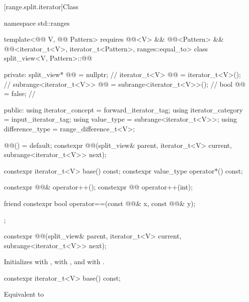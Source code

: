 [range.split.iterator]{Class }

\begin{codeblock}
namespace std::ranges {
  template<@@ V, @@ Pattern>
    requires @@<V> && @@<Pattern> &&
             @@<iterator_t<V>, iterator_t<Pattern>, ranges::equal_to>
  class split_view<V, Pattern>::@@ {
  private:
    split_view* @@ = nullptr;                              // \expos
    iterator_t<V> @@ = iterator_t<V>();                       // \expos
    subrange<iterator_t<V>> @@ = subrange<iterator_t<V>>();  // \expos
    bool @@ = false;                               // \expos

  public:
    using iterator_concept = forward_iterator_tag;
    using iterator_category = input_iterator_tag;
    using value_type = subrange<iterator_t<V>>;
    using difference_type = range_difference_t<V>;

    @@() = default;
    constexpr @@(split_view& parent, iterator_t<V> current, subrange<iterator_t<V>> next);

    constexpr iterator_t<V> base() const;
    constexpr value_type operator*() const;

    constexpr @@& operator++();
    constexpr @@ operator++(int);

    friend constexpr bool operator==(const @@& x, const @@& y);
  };
}
\end{codeblock}

\begin{itemdecl}
constexpr @@(split_view& parent, iterator_t<V> current, subrange<iterator_t<V>> next);
\end{itemdecl}

\begin{itemdescr}
\pnum
\effects
Initializes  with ,
 with , and
 with .
\end{itemdescr}

\begin{itemdecl}
constexpr iterator_t<V> base() const;
\end{itemdecl}

\begin{itemdescr}
\pnum
\effects
Equivalent to 
\end{itemdescr}

